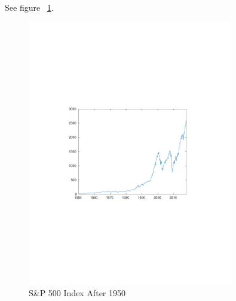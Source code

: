 \documentclass{article}
\begin{document}
See figure ~\ref{fig:sp500}.

\begin{figure}[H]
    \centering
        \includegraphics[width=0.8\textwidth]{sp500}
    \caption{S\&P 500 Index After 1950}
    \label{fig:sp500}
\end{figure}
\end{document}
